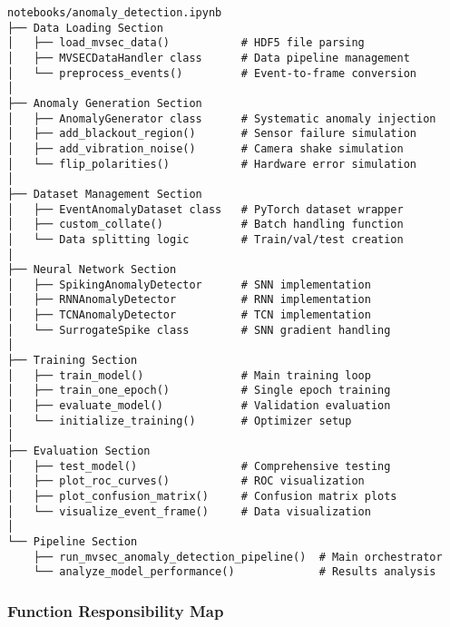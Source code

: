 \documentclass[12pt,a4paper]{article}
\begin{document}
\begin{lstlisting}[caption={Code Structure Overview}]
notebooks/anomaly_detection.ipynb
├── Data Loading Section
│   ├── load_mvsec_data()           # HDF5 file parsing
│   ├── MVSECDataHandler class      # Data pipeline management
│   └── preprocess_events()         # Event-to-frame conversion
│
├── Anomaly Generation Section
│   ├── AnomalyGenerator class      # Systematic anomaly injection
│   ├── add_blackout_region()       # Sensor failure simulation
│   ├── add_vibration_noise()       # Camera shake simulation
│   └── flip_polarities()           # Hardware error simulation
│
├── Dataset Management Section
│   ├── EventAnomalyDataset class   # PyTorch dataset wrapper
│   ├── custom_collate()            # Batch handling function
│   └── Data splitting logic        # Train/val/test creation
│
├── Neural Network Section
│   ├── SpikingAnomalyDetector      # SNN implementation
│   ├── RNNAnomalyDetector          # RNN implementation
│   ├── TCNAnomalyDetector          # TCN implementation
│   └── SurrogateSpike class        # SNN gradient handling
│
├── Training Section
│   ├── train_model()               # Main training loop
│   ├── train_one_epoch()           # Single epoch training
│   ├── evaluate_model()            # Validation evaluation
│   └── initialize_training()       # Optimizer setup
│
├── Evaluation Section
│   ├── test_model()                # Comprehensive testing
│   ├── plot_roc_curves()           # ROC visualization
│   ├── plot_confusion_matrix()     # Confusion matrix plots
│   └── visualize_event_frame()     # Data visualization
│
└── Pipeline Section
    ├── run_mvsec_anomaly_detection_pipeline()  # Main orchestrator
    └── analyze_model_performance()             # Results analysis
\end{lstlisting}

\subsubsection{Function Responsibility Map}
\end{document}
